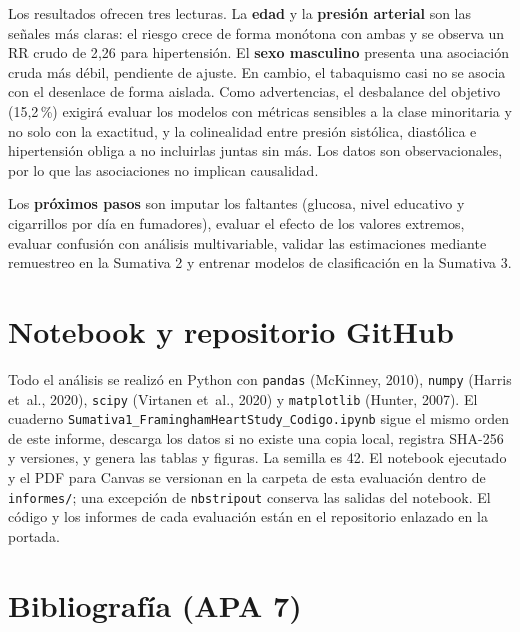 \documentclass[11pt,a4paper]{article}
\begin{document}
Los resultados ofrecen tres lecturas. La \textbf{edad} y la \textbf{presión arterial} son las señales más
claras: el riesgo crece de forma monótona con ambas y se observa un RR crudo de 2{,}26 para hipertensión.
El \textbf{sexo masculino} presenta una asociación cruda más débil, pendiente de ajuste. En cambio, el tabaquismo casi no se asocia
con el desenlace de forma aislada. Como advertencias, el desbalance del objetivo (15{,}2\,\%) exigirá evaluar
los modelos con métricas sensibles a la clase minoritaria y no solo con la exactitud, y la colinealidad entre
presión sistólica, diastólica e hipertensión obliga a no incluirlas juntas sin más. Los datos son
observacionales, por lo que las asociaciones no implican causalidad.

Los \textbf{próximos pasos} son imputar los faltantes (glucosa, nivel educativo y cigarrillos por día en
fumadores), evaluar el efecto de los valores extremos, evaluar confusión con análisis multivariable, validar las estimaciones mediante remuestreo en la
Sumativa 2 y entrenar modelos de clasificación en la Sumativa 3.

\section{Notebook y repositorio GitHub}

Todo el análisis se realizó en Python con \texttt{pandas} (McKinney, 2010), \texttt{numpy} (Harris et~al.,
2020), \texttt{scipy} (Virtanen et~al., 2020) y \texttt{matplotlib} (Hunter, 2007). El cuaderno
\texttt{Sumativa1\_\allowbreak FraminghamHeartStudy\_\allowbreak Codigo.ipynb} sigue el mismo orden de este informe, descarga los
datos si no existe una copia local, registra SHA-256 y versiones, y genera las tablas y figuras.
La semilla es 42. El notebook ejecutado y el PDF para Canvas se versionan en la carpeta de esta
evaluación dentro de \texttt{informes/}; una excepción de \texttt{nbstripout} conserva las salidas del notebook.
El código y los informes de cada evaluación están en el repositorio enlazado en la portada.

\clearpage
\section{Bibliografía (APA 7)}
\end{document}
